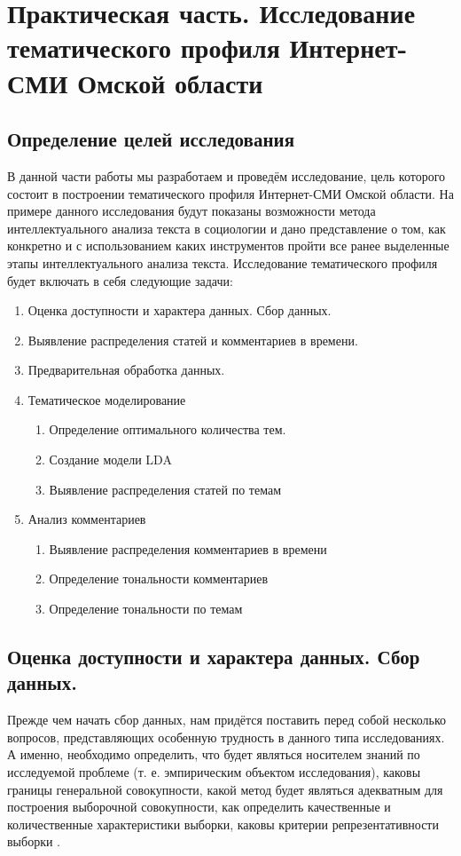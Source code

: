 \chapter{Практическая часть. Исследование тематического профиля Интернет-СМИ Омской области} \label{chapt2}
\section{Определение целей исследования} \label{sect2_1}
В данной части работы мы разработаем и проведём исследование, цель которого состоит в построении тематического профиля Интернет-СМИ Омской области. На примере данного исследования будут показаны возможности метода интеллектуального анализа текста в социологии и дано представление о том, как конкретно и с использованием каких инструментов пройти все ранее выделенные этапы интеллектуального анализа текста. Исследование тематического профиля будет включать в себя следующие задачи:

\begin{enumerate}
\item Оценка доступности и характера данных. Сбор данных.
\item Выявление распределения статей и комментариев в времени.
\item Предварительная обработка данных.
\item Тематическое моделирование
	\begin{enumerate}
	\item Определение оптимального количества тем.
	\item Создание модели LDA
	\item Выявление распределения статей по темам
	\end{enumerate}
\item Анализ комментариев
	\begin{enumerate}
	\item Выявление распределения комментариев в времени
	\item Определение тональности комментариев
	\item Определение тональности по темам
	\end{enumerate}

\end{enumerate}

\section{Оценка доступности и характера данных. Сбор данных.} \label{sect2_2}
Прежде чем начать сбор данных, нам придётся поставить перед собой несколько вопросов, представляющих особенную трудность в данного типа исследованиях. А именно, необходимо определить, что будет являться носителем знаний по исследуемой проблеме (т. е. эмпирическим объектом исследования), каковы границы генеральной совокупности, какой метод будет являться адекватным для построения выборочной совокупности, как определить качественные и количественные характеристики выборки, каковы критерии репрезентативности выборки \cite{methodlogy_internet}.

